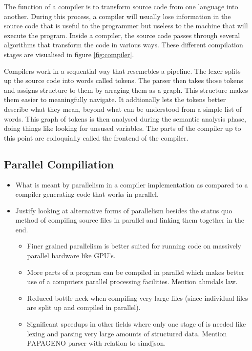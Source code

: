 The function of a compiler is to transform source code from one language into
another. During this process, a compiler will usually lose information in the
source code that is useful to the programmer but useless to the machine that
will execute the program. Inside a compiler, the source code passes through
several algorithms that transform the code in various ways. These different
compilation stages are visualised in figure \ref{fig:compiler}.

Compilers work in a sequential way that resemebles a pipeline. The lexer splits
up the source code into words called tokens. The parser then takes those tokens
and assigns structure to them by arraging them as a graph. This structure makes
them easier to meaningfully navigate. It addtionally lets the tokens better describe
what they mean, beyond what can be understood from a simple list of words. This
graph of tokens is then analysed during the semantic analysis phase, doing
things like looking for unsused variables. The parts of the compiler up to this
point are colloquially called the frontend of the compiler.


\subsection{Parallel Compiliation}
\begin{sectionplan}
    \begin{itemize}
	\item What is meant by parallelism in a compiler implementation as  compared to
          a compiler generating code that works in parallel.

	\item Justify looking at alternative forms of parallelism besides the status quo
          method of compiling source files in parallel and linking them together
          in the end.

		\begin{itemize}
         	\item Finer grained parallelism is better suited for running code on 				
				  massively parallel hardware like GPU's.

         	\item More parts of a program can be compiled in parallel which makes
				  better use of a computers parallel processing facilities. Mention 
				  ahmdals law.

         	\item Reduced bottle neck when compiling very large files (since
				  individual files are split up and compiled in parallel).

			\item Significant speedups in other fields where only one stage of is 
				  needed like lexing and parsing very large amounts of structured 
				  data. Mention PAPAGENO parser with relation to simdjson.
		\end{itemize}

    \end{itemize}
\end{sectionplan}

